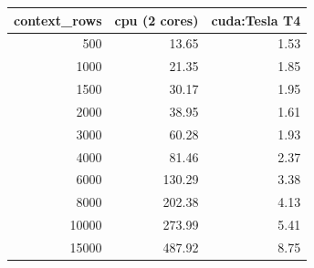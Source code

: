 \begin{tabular}{rrr}
\toprule
context_rows & cpu (2 cores) & cuda:Tesla T4 \\
\midrule
500 & 13.65 & 1.53 \\
1000 & 21.35 & 1.85 \\
1500 & 30.17 & 1.95 \\
2000 & 38.95 & 1.61 \\
3000 & 60.28 & 1.93 \\
4000 & 81.46 & 2.37 \\
6000 & 130.29 & 3.38 \\
8000 & 202.38 & 4.13 \\
10000 & 273.99 & 5.41 \\
15000 & 487.92 & 8.75 \\
\bottomrule
\end{tabular}
